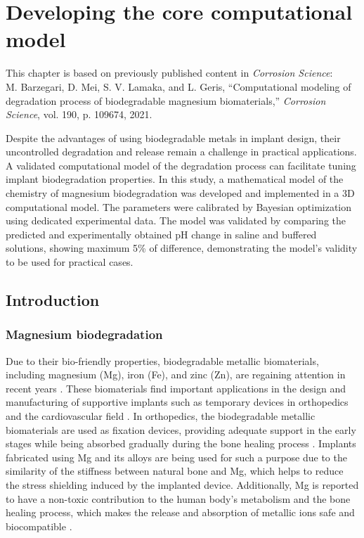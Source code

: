 \chapter{Developing the core computational model}\label{ch:core}

\begin{tcolorbox}
This chapter is based on previously published content in \textit{Corrosion Science}:\\
M. Barzegari, D. Mei, S. V. Lamaka, and L. Geris, ``Computational modeling of degradation process of biodegradable magnesium biomaterials,'' \textit{Corrosion Science}, vol. 190, p. 109674, 2021.
\end{tcolorbox}

Despite the advantages of using biodegradable metals in implant design, their uncontrolled degradation and release remain a challenge in practical applications. A validated computational model of the degradation process can facilitate tuning implant biodegradation properties. In this study, a mathematical model of the chemistry of magnesium biodegradation was developed and implemented in a 3D computational model. The parameters were calibrated by Bayesian optimization using dedicated experimental data. The model was validated by comparing the predicted and experimentally obtained pH change in saline and buffered solutions, showing maximum 5\% of difference, demonstrating the model's validity to be used for practical cases.


\section{Introduction}

\subsection{Magnesium biodegradation}

Due to their bio-friendly properties, biodegradable metallic biomaterials, including magnesium (Mg), iron (Fe), and zinc (Zn), are regaining attention in recent years \cite{Zheng2014}. These biomaterials find important applications in the design and manufacturing of supportive implants such as temporary devices in orthopedics and the cardiovascular field  \cite{Chen2014,Zhao2017}. In orthopedics, the biodegradable metallic biomaterials are used as fixation devices, providing adequate support in the early stages while being absorbed gradually during the bone healing process \cite{Qin2019}. Implants fabricated using Mg and its alloys are being used for such a purpose \cite{Riaz2018} due to the similarity of the stiffness between natural bone and Mg, which helps to reduce the stress shielding induced by the implanted device. Additionally, Mg is reported to have a non-toxic contribution to the human body's metabolism and the bone healing process, which makes the release and absorption of metallic ions safe and biocompatible \cite{Xin2008}.

